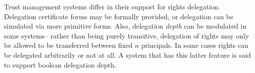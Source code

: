 Trust management systems differ in their support for rights
delegation. Delegation certificate forms may be formally provided, or
delegation can be simulated via more primitive forms.  Also,
delegation \emph{depth} can be modulated in some systems-- rather than
being purely transitive, delegation of rights may only be allowed to
be transferred between fixed $n$ principals. In some cases rights can be
delegated arbitrarily or not at all. A system that has this latter
feature is said to support boolean delegation depth.
%
%
%


